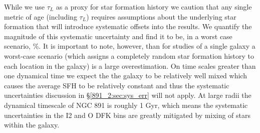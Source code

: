 


While we use $\tau_L$ as a proxy for star formation history we caution
that any single metric of age (including $\tau_L$) requires
assumptions about the underlying star formation that will introduce
systematic offsets into the results. We quantify the magnitude of this
systematic uncertainty and find it to be, in a worst case scenario,
\%. It is important to note, however, than for studies of a
single galaxy a worst-case scenario (which assigns a completely random
star formation history to each location in the galaxy) is a large
overestimation. On time scales greater than one dynamical time we
expect the the galaxy to be relatively well mixed which causes the
average SFH to be relatively constant and thus the systematic
uncertainties discussion in \S\ref{891_2:sec:sys_err} will not apply. At
large radii the dynamical timescale of NGC 891 is roughly 1 Gyr, which
means the systematic uncertainties in the I2 and O DFK bins are
greatly mitigated by mixing of stars within the galaxy.

